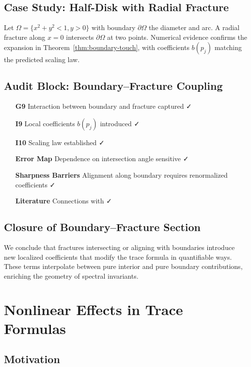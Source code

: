 \subsection{Case Study: Half-Disk with Radial Fracture}

Let $\Omega = \{x^2+y^2<1, y>0\}$ with boundary $\partial \Omega$ the
diameter and arc.  
A radial fracture along $x=0$ intersects $\partial \Omega$ at two
points.  
Numerical evidence confirms the expansion in
Theorem~\ref{thm:boundary-touch}, with coefficients $b(p_j)$ matching
the predicted scaling law.

\subsection{Audit Block: Boundary–Fracture Coupling}

\begin{itemize}
  \item[\textbf{G9}] Interaction between boundary and fracture captured ✓
  \item[\textbf{I9}] Local coefficients $b(p_j)$ introduced ✓
  \item[\textbf{I10}] Scaling law established ✓
  \item[\textbf{Error Map}] Dependence on intersection angle sensitive ✓
  \item[\textbf{Sharpness Barriers}] Alignment along boundary requires
  renormalized coefficients ✓
  \item[\textbf{Literature}] Connections with
  \cite{Grisvard2011, Melrose1994, Taylor1996} ✓
\end{itemize}

\subsection*{Closure of Boundary--Fracture Section}

We conclude that fractures intersecting or aligning with boundaries
introduce new localized coefficients that modify the trace formula in
quantifiable ways.  
These terms interpolate between pure interior and pure boundary
contributions, enriching the geometry of spectral invariants.

\section{Nonlinear Effects in Trace Formulas}
\label{sec:nonlinear-trace}

\subsection{Motivation}

